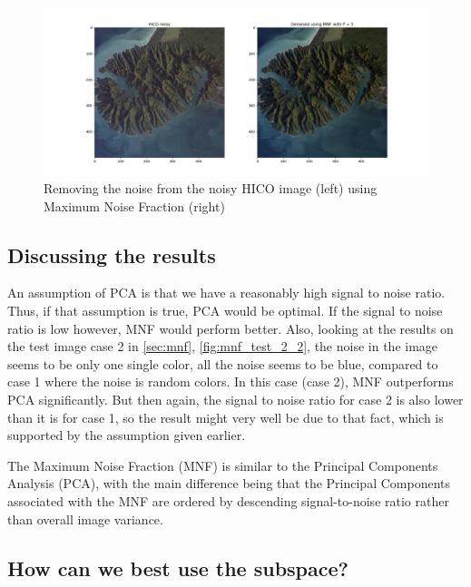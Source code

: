 \begin{figure}
    \centering
    \includegraphics[width=\textwidth]{../fig/HICO_mnf.png}
    \caption{Removing the noise from the noisy HICO image (left) using Maximum Noise Fraction (right)}
    \label{fig:HICO_mnf}
\end{figure}


\subsection{Discussing the results}

An assumption of PCA is that we have a reasonably high signal to noise ratio. Thus, 
if that assumption is true, PCA would be optimal. If the signal to noise ratio is low 
however, MNF would perform better. Also, looking at the results on the test image 
case 2 in \cref{sec:mnf}, \cref{fig:mnf_test_2_2}, the noise in the image seems to be only one single color, 
all the noise seems to be blue, compared to case 1 where the noise is random colors. 
In this case (case 2), MNF outperforms PCA significantly. But then again, the signal 
to noise ratio for case 2 is also lower than it is for case 1, so the result might 
very well be due to that fact, which is supported by the assumption given earlier. 

The Maximum Noise Fraction (MNF) is similar to the Principal Components Analysis (PCA), 
with the main difference being that the Principal Components associated with the MNF are 
ordered by descending signal-to-noise ratio rather than overall image variance. 

\subsection{How can we best use the subspace?}

